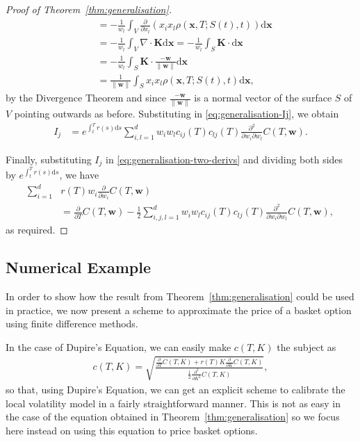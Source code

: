 \documentclass[english]{article}
\numberwithin{equation}{section}
\numberwithin{figure}{section}
\theoremstyle{bolddescit}
\theoremstyle{definition}
\theoremstyle{definition}
\theoremstyle{plain}
\theoremstyle{plain}
\theoremstyle{bolddesc}
\theoremstyle{plain}
\theoremstyle{remark}
\begin{document}
\begin{proof}[Proof of Theorem~\ref{thm:generalisation}]
\begin{align*}
    &= -\frac{1}{w_l} \int_V \frac{\partial}{\partial x_l} \left(x_i x_l \rho(\mathbf{x},T;S(t),t)\right) \mathrm{d}\mathbf{x}\\
    &= -\frac{1}{w_l} \int_V \nabla \cdot \mathbf{K} \mathrm{d}\mathbf{x}
    = -\frac{1}{w_l} \int_S \mathbf{K} \cdot \mathrm{d}\mathbf{x}\\
    &= -\frac{1}{w_l} \int_S \mathbf{K} \cdot \frac{-\mathbf{w}}{\|\mathbf{w}\|} \mathrm{d}\mathbf{x}\\
    &= \frac{1}{\|\mathbf{w}\|} \int_S x_i x_l \rho(\mathbf{x},T;S(t),t) \mathrm{d}\mathbf{x},
  \end{align*}
  by the Divergence Theorem and since $\frac{-\mathbf{w}}{\|\mathbf{w}\|}$ is a normal vector of the surface $S$ of $V$ pointing outwards as before. Substituting in \eqref{eq:generalisation-Ij}, we obtain
  \begin{align*}
    I_j
    &= e^{\int_t^T r(s) \mathrm{d}s} \sum_{i,l=1}^{d} w_i w_l c_{ij}(T) c_{lj}(T) \frac{\partial^2}{\partial w_i \partial w_l} C(T,\mathbf{w}).
  \end{align*}

  Finally, substituting $I_j$ in \eqref{eq:generalisation-two-derivs} and dividing both sides by $e^{\int_t^T r(s) \mathrm{d}s}$, we have
  \begin{align*}
    \sum_{i=1}^{d} &r(T) w_i \frac{\partial}{\partial w_i} C(T,\mathbf{w})\\
    &= \frac{\partial}{\partial T} C(T,\mathbf{w}) - \frac{1}{2} \sum_{i,j,l=1}^{d} w_i w_l c_{ij}(T) c_{lj}(T) \frac{\partial^2}{\partial w_i \partial w_l} C(T,\mathbf{w}),
  \end{align*}
  as required.
\end{proof}

\subsection{Numerical Example}


In order to show how the result from Theorem~\ref{thm:generalisation} could be used in practice, we now present a scheme to approximate the price of a basket option using finite difference methods.

In the case of Dupire's Equation, we can easily make $c(T,K)$ the subject as
\begin{align}
  c(T,K) = \sqrt{\frac{\frac{\partial}{\partial T} C(T,K) + r(T) K \frac{\partial}{\partial K} C(T,K)}{\frac{1}{2}\frac{\partial^2}{\partial K^2} C(T,K)}},\label{eq:dupire-calibration}
\end{align}
so that, using Dupire's Equation, we can get an explicit scheme to calibrate the local volatility model in a fairly straightforward manner. This is not as easy in the case of the equation obtained in Theorem~\ref{thm:generalisation} so we focus here instead on using this equation to price basket options.
\end{document}
